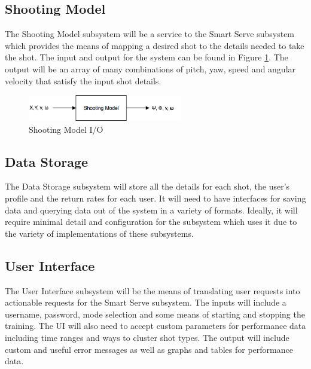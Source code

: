 \documentclass[11pt]{article}
\begin{document}
\subsection{Shooting Model}
The Shooting Model subsystem will be a service to the Smart Serve subsystem which provides the means of mapping a desired shot to the details needed to take the shot. The input and output for the system can be found in Figure \ref{fig:shotmodel}. The output will be an array of many combinations of pitch, yaw, speed and angular velocity that satisfy the input shot details.
\begin{figure}[htbp]
   \centering
   \includegraphics[width=0.6\textwidth]{img/ShotModel.png} %
   \caption{Shooting Model I/O}
   \label{fig:shotmodel}
\end{figure}
\subsection{Data Storage}
The Data Storage subsystem will store all the details for each shot, the user's profile and the return rates for each user. It will need to have interfaces for saving data and querying data out of the system in a variety of formats. Ideally, it will require minimal detail and configuration for the subsystem which uses it due to the variety of implementations of these subsystems.
\subsection{User Interface}
The User Interface subsystem will be the means of translating user requests into actionable requests for the Smart Serve subsystem. The inputs will include a username, password, mode selection and some means of starting and stopping the training. The UI will also need to accept custom parameters for performance data including time ranges and ways to cluster shot types. The output will include custom and useful error messages as well as graphs and tables for performance data.
\end{document}
